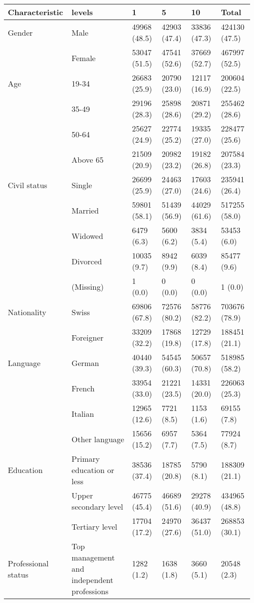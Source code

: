
\begin{tabular}{llllll}
\toprule
Characteristic & levels & 1 & 5 & 10 & Total\\
\midrule
Gender & Male & 49968 (48.5) & 42903 (47.4) & 33836 (47.3) & 424130 (47.5)\\
 & Female & 53047 (51.5) & 47541 (52.6) & 37669 (52.7) & 467997 (52.5)\\
\addlinespace
Age & 19-34 & 26683 (25.9) & 20790 (23.0) & 12117 (16.9) & 200604 (22.5)\\
 & 35-49 & 29196 (28.3) & 25898 (28.6) & 20871 (29.2) & 255462 (28.6)\\
 & 50-64 & 25627 (24.9) & 22774 (25.2) & 19335 (27.0) & 228477 (25.6)\\
 & Above 65 & 21509 (20.9) & 20982 (23.2) & 19182 (26.8) & 207584 (23.3)\\
\addlinespace
Civil status & Single & 26699 (25.9) & 24463 (27.0) & 17603 (24.6) & 235941 (26.4)\\
 & Married & 59801 (58.1) & 51439 (56.9) & 44029 (61.6) & 517255 (58.0)\\
 & Widowed & 6479 (6.3) & 5600 (6.2) & 3834 (5.4) & 53453 (6.0)\\
 & Divorced & 10035 (9.7) & 8942 (9.9) & 6039 (8.4) & 85477 (9.6)\\
 & (Missing) & 1 (0.0) & 0 (0.0) & 0 (0.0) & 1 (0.0)\\
\addlinespace
Nationality & Swiss & 69806 (67.8) & 72576 (80.2) & 58776 (82.2) & 703676 (78.9)\\
 & Foreigner & 33209 (32.2) & 17868 (19.8) & 12729 (17.8) & 188451 (21.1)\\
\addlinespace
Language & German & 40440 (39.3) & 54545 (60.3) & 50657 (70.8) & 518985 (58.2)\\
 & French & 33954 (33.0) & 21221 (23.5) & 14331 (20.0) & 226063 (25.3)\\
 & Italian & 12965 (12.6) & 7721 (8.5) & 1153 (1.6) & 69155 (7.8)\\
 & Other language & 15656 (15.2) & 6957 (7.7) & 5364 (7.5) & 77924 (8.7)\\
\addlinespace
Education & Primary education or less & 38536 (37.4) & 18785 (20.8) & 5790 (8.1) & 188309 (21.1)\\
 & Upper secondary level & 46775 (45.4) & 46689 (51.6) & 29278 (40.9) & 434965 (48.8)\\
 & Tertiary level & 17704 (17.2) & 24970 (27.6) & 36437 (51.0) & 268853 (30.1)\\
\addlinespace
Professional status & Top management and independent professions & 1282 (1.2) & 1638 (1.8) & 3660 (5.1) & 20548 (2.3)\\

\end{tabular}
